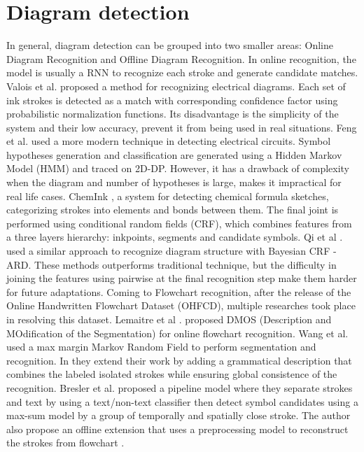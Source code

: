 \section{Diagram detection}
In general, diagram detection can be grouped into two smaller areas: Online Diagram Recognition and Offline Diagram Recognition. In online recognition, the model is usually a RNN to recognize each stroke and generate candidate matches.
Valois et al. \cite{44} proposed a method for recognizing electrical diagrams. Each set of ink strokes is detected as a match with corresponding confidence factor using probabilistic normalization functions. Its disadvantage is the simplicity of the system and their low accuracy, prevent it from being used in real situations. Feng et al. \cite{45} used a more modern technique in detecting electrical circuits. Symbol hypotheses generation and classification are generated using a Hidden Markov Model (HMM) and traced on 2D-DP. However, it has a drawback of complexity when the diagram and number of hypotheses is large, makes it impractical for real life cases. ChemInk \cite{46}, a system for detecting chemical formula sketches, categorizing strokes into elements and bonds between them. The final joint is performed using conditional random fields (CRF), which combines features from a three layers hierarchy: inkpoints, segments and candidate symbols. Qi et al \cite{47}. used a similar approach to recognize diagram structure with Bayesian CRF - ARD. These methods outperforms traditional technique, but the difficulty in joining the features using pairwise at the final recognition step make them harder for future adaptations. Coming to Flowchart recognition, after the release of the Online Handwritten Flowchart Dataset (OHFCD), multiple researches took place in resolving this dataset. Lemaitre et al \cite{48}. proposed DMOS (Description and MOdification of the Segmentation) for online flowchart recognition. Wang et al. \cite{49} used a max margin Markov Random Field to perform segmentation and recognition. In \cite{50} they extend their work by adding a grammatical description that combines the labeled isolated strokes while ensuring global consistence of the recognition. Bresler et al. proposed a pipeline model where they separate strokes and text by using a text/non-text classifier then detect symbol candidates using a max-sum model by a group of temporally and spatially close stroke. The author also propose an offline extension that uses a preprocessing model to reconstruct the strokes from flowchart \cite{51,52}.

